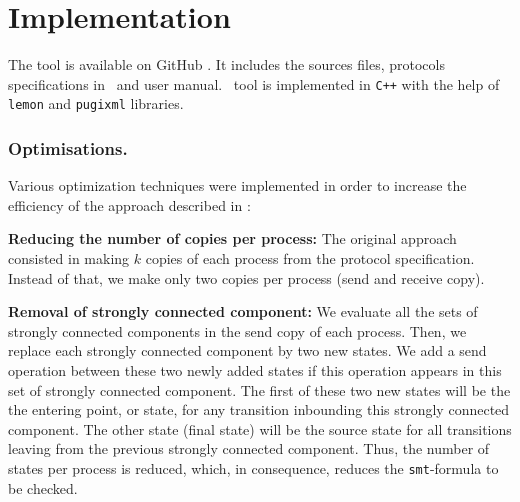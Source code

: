 \section{Implementation}
\label{sec:optim}

The tool is available on GitHub \cite{github.MPass}.
It includes the sources files, protocols specifications in \xml\ and user manual.
%
\MPass\ tool is implemented in \texttt{C++} with the help of \texttt{lemon} and \texttt{pugixml} libraries.

\subsubsection{Optimisations.}

Various optimization techniques were implemented in order to increase the efficiency of the approach described in  \cite{AAC13}:

\begin{description}
\item{\textbf{Reducing the number of copies per process:}}
The original approach consisted in making $k$ copies of each process from the protocol specification.
Instead of that, we make only two copies per process (send and receive copy).
%
\item{\textbf{Removal of strongly connected component:}}
We evaluate all the sets of strongly connected components in the send copy of each process. 
Then, we replace each strongly connected component by two new states.
We add a send operation between these two newly added states if this operation appears in this set of strongly connected component.
The first of these two new states will be the the entering point, or state, for any transition inbounding this strongly connected component.
The other state (final state) will be  the source state for all transitions leaving from the previous strongly connected component.
Thus, the number of states per process is reduced, which, in consequence, reduces the \texttt{smt}-formula to be checked.
\end{description}
